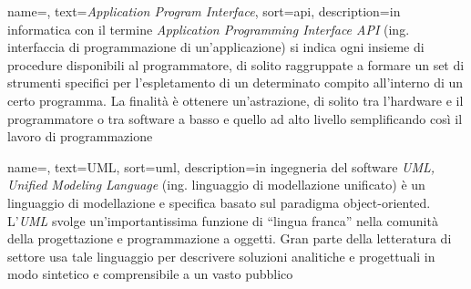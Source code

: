 
\renewcommand{\acronymname}{Acronimi e abbreviazioni}











\renewcommand{\glossaryname}{Glossario}

{
    name=,
    text=\emph{Application Program Interface},
    sort=api,
    description={in informatica con il termine \emph{Application Programming Interface API} (ing. interfaccia di programmazione di un'applicazione) si indica ogni insieme di procedure disponibili al programmatore, di solito raggruppate a formare un set di strumenti specifici per l'espletamento di un determinato compito all'interno di un certo programma. La finalità è ottenere un'astrazione, di solito tra l'hardware e il programmatore o tra software a basso e quello ad alto livello semplificando così il lavoro di programmazione}
}

{
    name=,
    text=UML,
    sort=uml,
    description={in ingegneria del software \emph{UML, Unified Modeling Language} (ing. linguaggio di modellazione unificato) è un linguaggio di modellazione e specifica basato sul paradigma object-oriented. L'\emph{UML} svolge un'importantissima funzione di ``lingua franca'' nella comunità della progettazione e programmazione a oggetti. Gran parte della letteratura di settore usa tale linguaggio per descrivere soluzioni analitiche e progettuali in modo sintetico e comprensibile a un vasto pubblico}
}

